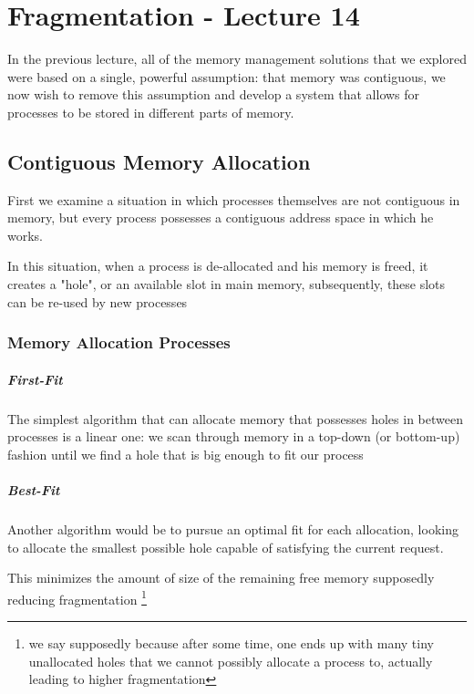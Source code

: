 \documentclass[openright, twoside]{report}
\theoremstyle{definition}
\theoremstyle{example}
\begin{document}
\chapter{Fragmentation - Lecture 14}

In the previous lecture, all of the memory management solutions that we 
explored were based on a single, powerful assumption: that memory was 
contiguous, we now wish to remove this assumption and develop a system that 
allows for processes to be stored in different parts of memory.

\section{Contiguous Memory Allocation}

First we examine a situation in which processes themselves are not 
contiguous in memory, but every process possesses a contiguous 
address space in which he works.

In this situation, when a process is de-allocated and his memory 
is freed, it creates a "hole", or an available slot in main memory,
subsequently, these slots can be re-used by new processes 

\subsection{Memory Allocation Processes}

\paragraph{First-Fit}
	The simplest algorithm that can allocate memory that possesses 
	holes in between processes is a linear one: we scan through memory 
	in a top-down (or bottom-up) fashion until we find a hole that is 
	big enough to fit our process

\paragraph{Best-Fit}
	Another algorithm would be to pursue an optimal fit for each allocation, 
	looking to allocate the smallest possible hole capable of satisfying
	the current request.

	This minimizes the amount of size of the remaining free memory
	supposedly reducing fragmentation
	\footnote{
		we say supposedly because after some time, one ends up with 
		many tiny unallocated holes that we cannot possibly allocate
		a process to, actually leading to higher fragmentation
	}
\end{document}

